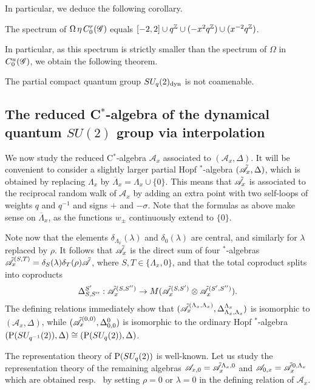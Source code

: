 In particular, we deduce the following corollary.

\begin{Cor} The spectrum of $\Omega \,\eta\, C^{r}_{0}(\mathscr{G})$ equals $\lbrack -2,2\rbrack \cup q^{\mathbb{Z}} \cup (-x^2q^{\mathbb{Z}})\cup (x^{-2}q^{\mathbb{Z}})$.
\end{Cor} 

In particular, as this spectrum is strictly smaller than the spectrum of $\Omega$ in $C^{u}_{0}(\mathscr{G})$, we obtain the following theorem.

\begin{Theorem} The partial compact quantum group $SU_q(2)_{\operatorname{\mathrm{dyn}}}$ is not coamenable.
\end{Theorem} 




\subsection{The reduced C$^*$-algebra of the dynamical quantum $SU(2)$ group via interpolation}

We now study the reduced C$^*$-algebra $\mathcal{A}_x$ associated to $(\mathscr{A}_x,\Delta)$. It will be convenient to consider a slightly larger partial Hopf $^*$-algebra $(\tilde{\mathscr{A}}_x,\Delta)$, which is obtained by replacing $\Lambda_x$ by $\overline{\Lambda}_x = \Lambda_x\cup \{0\}$. This means that $\tilde{\mathscr{A}}_x$ is associated to the reciprocal random walk of $\mathscr{A}_x$ by adding an extra point with two self-loops of weights $q$ and $q^{-1}$ and signs $+$ and $-\sigma$. Note that the formulas as above make sense on $\overline{\Lambda}_x$, as the functions $w_{\pm}$ continuously extend to $\{0\}$. 

Note now that the elements $\delta_{\Lambda_x}(\lambda)$ and $\delta_0(\lambda)$ are central, and similarly for $\lambda$ replaced by $\rho$. It follows that $\tilde{\mathscr{A}}_x$ is the direct sum of four $^*$-algebras $\tilde{\mathscr{A}}_x^{(S,T)} = \delta_{S}(\lambda)\delta_T(\rho)\tilde{\mathscr{A}}$, where $S,T\in \{\Lambda_x,0\}$, and that the total coproduct splits into coproducts \[\Delta_{S,S''}^{S'}:\tilde{\mathscr{A}}_x^{(S,S'')} \rightarrow M(\tilde{\mathscr{A}}_x^{(S,S')}\otimes \tilde{\mathscr{A}}_x^{(S',S'')}).\] The defining relations immediately show that $(\tilde{\mathscr{A}}_x^{(\Lambda_x,\Lambda_x)},\Delta_{\Lambda_x,\Lambda_x}^{\Lambda_x})$ is isomorphic to $(\mathscr{A}_x,\Delta)$, while $(\tilde{\mathscr{A}}_x^{(0,0)},\Delta_{0,0}^0)$ is isomorphic to the ordinary Hopf $^*$-algebra $(\operatorname{\mathrm{P}}(SU_{q^{-1}}(2)),\Delta) \cong (\operatorname{\mathrm{P}}(SU_q(2)),\Delta)$.

The representation theory of $\operatorname{\mathrm{P}}(SU_q(2))$ is well-known. Let us study the representation theory of the remaining algebras $\mathscr{A}_{x,0} = \tilde{\mathscr{A}}_x^{\Lambda_x,0}$ and $\mathscr{A}_{0,x} = \tilde{\mathscr{A}}_x^{0,\Lambda_x}$ which are obtained resp.~ by setting $\rho=0$ or $\lambda = 0$ in the defining relation of $\mathscr{A}_x$. 

